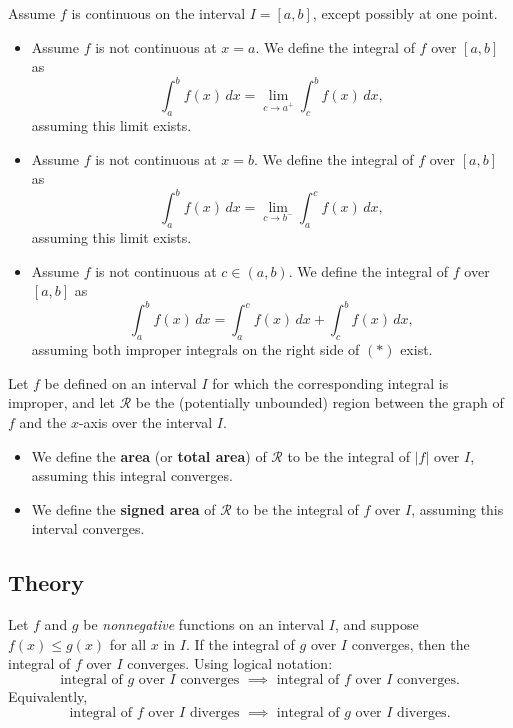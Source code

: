 \begin{samepage}
\begin{namedtheorem} Assume $f$ is continuous on the interval $I=[a,b]$, except possibly at one point.
  \begin{itemize}
    \item Assume $f$ is not continuous at $x=a$. We define the integral of $f$ over $[a,b]$ as
    \[
    \int_a^bf(x)\, dx=\lim_{c\to a^+}\int_c^b f(x)\, dx,
    \]
    assuming this limit exists.
    \item Assume $f$ is not continuous at $x=b$. We define the integral of $f$ over $[a,b]$ as
    \[
    \int_a^bf(x)\, dx=\lim_{c\to b^-}\int_a^c f(x)\, dx,
    \]
    assuming this limit exists.
    \item Assume $f$ is not continuous at $c\in (a,b)$. We define the integral of $f$ over $[a,b]$ as
    \[
    \int_a^bf(x)\, dx=\int_a^c f(x)\, dx+ \int_c^b f(x)\, dx, \tag{$*$}
    \]
    assuming both improper integrals on the right side of $(*)$ exist.
  \end{itemize}

\end{namedtheorem}
\end{samepage}
\begin{namedtheorem} Let $f$ be defined on an interval $I$ for which the corresponding integral is improper, and let $\mathcal{R}$ be the (potentially unbounded) region between the graph of $f$ and the $x$-axis over the interval $I$.
  \begin{itemize}
  \item We define the {\bf area} (or {\bf total area}) of $\mathcal{R}$ to be the integral of $\lvert f\rvert$ over $I$, assuming this integral converges.
  \item We define the {\bf signed area} of $\mathcal{R}$ to be the integral of $f$ over $I$, assuming this interval converges.
\end{itemize}
\end{namedtheorem}

 \subsection*{Theory}
\begin{namedtheorem} Let $f$ and $g$ be {\em nonnegative} functions on an interval $I$, and suppose $f(x)\leq g(x)$ for all $x$ in $I$. If the integral of $g$ over $I$ converges, then the integral of $f$ over $I$ converges. Using logical notation:
  \[
  \text{integral of $g$ over $I$ converges }\implies \text{ integral of $f$ over $I$ converges}.
  \]
  Equivalently,
  \[
  \text{integral of $f$ over $I$ diverges }\implies \text{ integral of $g$ over $I$ diverges}.
  \]
\end{namedtheorem}

